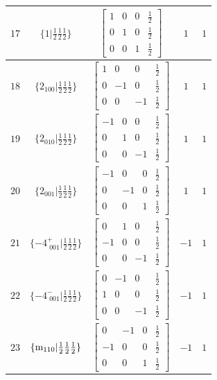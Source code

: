 \documentclass[fleqn,8pt]{jsarticle}
\begin{document}
\begin{longtable}{ccccc}
$ 17 $ & $ \{1|\frac{1}{2} \frac{1}{2} \frac{1}{2}\} $ & $ \begin{bmatrix} 1 & 0 & 0 & \frac{1}{2} \\ 0 & 1 & 0 & \frac{1}{2} \\ 0 & 0 & 1 & \frac{1}{2} \end{bmatrix} $ & $ 1 $ & $ 1 $ \\ \hline
$ 18 $ & $ \{2{}_{100}|\frac{1}{2} \frac{1}{2} \frac{1}{2}\} $ & $ \begin{bmatrix} 1 & 0 & 0 & \frac{1}{2} \\ 0 & -1 & 0 & \frac{1}{2} \\ 0 & 0 & -1 & \frac{1}{2} \end{bmatrix} $ & $ 1 $ & $ 1 $ \\ \hline
$ 19 $ & $ \{2{}_{010}|\frac{1}{2} \frac{1}{2} \frac{1}{2}\} $ & $ \begin{bmatrix} -1 & 0 & 0 & \frac{1}{2} \\ 0 & 1 & 0 & \frac{1}{2} \\ 0 & 0 & -1 & \frac{1}{2} \end{bmatrix} $ & $ 1 $ & $ 1 $ \\ \hline
$ 20 $ & $ \{2{}_{001}|\frac{1}{2} \frac{1}{2} \frac{1}{2}\} $ & $ \begin{bmatrix} -1 & 0 & 0 & \frac{1}{2} \\ 0 & -1 & 0 & \frac{1}{2} \\ 0 & 0 & 1 & \frac{1}{2} \end{bmatrix} $ & $ 1 $ & $ 1 $ \\ \hline
$ 21 $ & $ \{-4^{+}_{\,\,001}|\frac{1}{2} \frac{1}{2} \frac{1}{2}\} $ & $ \begin{bmatrix} 0 & 1 & 0 & \frac{1}{2} \\ -1 & 0 & 0 & \frac{1}{2} \\ 0 & 0 & -1 & \frac{1}{2} \end{bmatrix} $ & $ -1 $ & $ 1 $ \\ \hline
$ 22 $ & $ \{-4^{-}_{\,\,001}|\frac{1}{2} \frac{1}{2} \frac{1}{2}\} $ & $ \begin{bmatrix} 0 & -1 & 0 & \frac{1}{2} \\ 1 & 0 & 0 & \frac{1}{2} \\ 0 & 0 & -1 & \frac{1}{2} \end{bmatrix} $ & $ -1 $ & $ 1 $ \\ \hline
$ 23 $ & $ \{{\rm m}_{110}|\frac{1}{2} \frac{1}{2} \frac{1}{2}\} $ & $ \begin{bmatrix} 0 & -1 & 0 & \frac{1}{2} \\ -1 & 0 & 0 & \frac{1}{2} \\ 0 & 0 & 1 & \frac{1}{2} \end{bmatrix} $ & $ -1 $ & $ 1 $ \\ \hline

\end{longtable}
\end{document}
